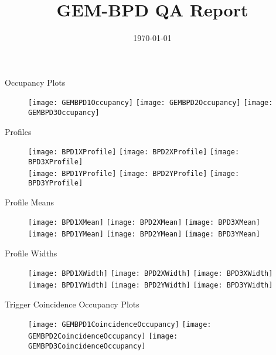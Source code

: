 \documentclass[11pt]{beamer}
\title[QA]{GEM-BPD QA Report}
\date{\today}
\begin{document}
\begin{frame}
  \titlepage
\end{frame}

\begin{frame}{Occupancy Plots}
\begin{figure}
\centering
\texttt{[image: GEMBPD1Occupancy]}
\texttt{[image: GEMBPD2Occupancy]}
\texttt{[image: GEMBPD3Occupancy]}
\end{figure}
\end{frame}

\begin{frame}{Profiles}
\begin{figure}
\centering
\texttt{[image: BPD1XProfile]}
\texttt{[image: BPD2XProfile]}
\texttt{[image: BPD3XProfile]} \\
\texttt{[image: BPD1YProfile]}
\texttt{[image: BPD2YProfile]}
\texttt{[image: BPD3YProfile]}
\end{figure}
\end{frame}

\begin{frame}{Profile Means}
\begin{figure}
\centering
\texttt{[image: BPD1XMean]}
\texttt{[image: BPD2XMean]}
\texttt{[image: BPD3XMean]} \\
\texttt{[image: BPD1YMean]}
\texttt{[image: BPD2YMean]}
\texttt{[image: BPD3YMean]}
\end{figure}
\end{frame}

\begin{frame}{Profile Widths}
\begin{figure}
\centering
\texttt{[image: BPD1XWidth]}
\texttt{[image: BPD2XWidth]}
\texttt{[image: BPD3XWidth]} \\
\texttt{[image: BPD1YWidth]}
\texttt{[image: BPD2YWidth]}
\texttt{[image: BPD3YWidth]}
\end{figure}
\end{frame}

\begin{frame}{Trigger Coincidence Occupancy Plots}
\begin{figure}
\centering
\texttt{[image: GEMBPD1CoincidenceOccupancy]}
\texttt{[image: GEMBPD2CoincidenceOccupancy]}
\texttt{[image: GEMBPD3CoincidenceOccupancy]}
\end{figure}
\end{frame}
\end{document}
